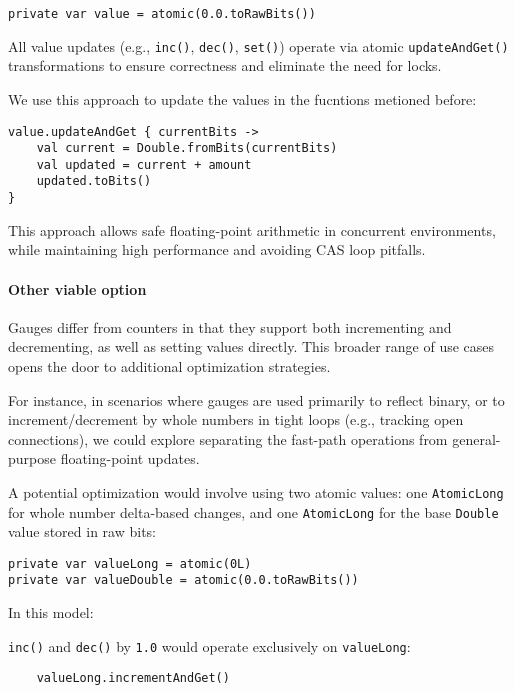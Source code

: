 \begin{verbatim}
private var value = atomic(0.0.toRawBits())
\end{verbatim}

All value updates (e.g., \texttt{inc()}, \texttt{dec()}, \texttt{set()}) operate via atomic \texttt{updateAndGet()} transformations to ensure correctness and eliminate the need for locks.

We use this approach to update the values in the fucntions metioned before:
\begin{verbatim}
value.updateAndGet { currentBits ->
    val current = Double.fromBits(currentBits)
    val updated = current + amount
    updated.toBits()
}
\end{verbatim}

This approach allows safe floating-point arithmetic in concurrent environments, while maintaining high performance and avoiding CAS loop pitfalls.


\paragraph{Other viable option}
Gauges differ from counters in that they support both incrementing and decrementing, as well as setting values directly. This broader range of use cases opens the door to additional optimization strategies.

For instance, in scenarios where gauges are used primarily to reflect binary, or to increment/decrement by whole numbers in tight loops (e.g., tracking open connections), we could explore separating the fast-path operations from general-purpose floating-point updates.

A potential optimization would involve using two atomic values: one \texttt{AtomicLong} for whole number delta-based changes, and one \texttt{AtomicLong} for the base \texttt{Double} value stored in raw bits:

\begin{verbatim}
private var valueLong = atomic(0L)
private var valueDouble = atomic(0.0.toRawBits())
\end{verbatim}

In this model:

    \texttt{inc()} and \texttt{dec()} by \texttt{1.0} would operate exclusively on \texttt{valueLong}:
    \begin{verbatim}
    valueLong.incrementAndGet()
    \end{verbatim}

